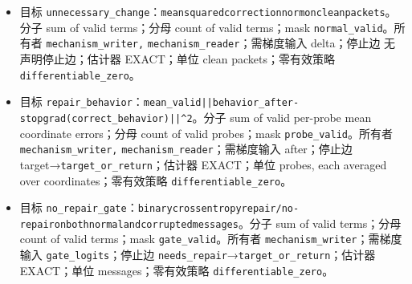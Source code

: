 \documentclass[
  10pt,
]{article}
\begin{document}
\begin{itemize}
\item
  目标
  \nolinkurl{unnecessary_change}：{\small\nolinkurl{mean}\hspace{0.333em}\nolinkurl{squared}\hspace{0.333em}\nolinkurl{correction}\hspace{0.333em}\nolinkurl{norm}\hspace{0.333em}\nolinkurl{on}\hspace{0.333em}\nolinkurl{clean}\hspace{0.333em}\nolinkurl{packets}}。分子
  sum of valid terms；分母 count of valid terms；mask
  \nolinkurl{normal_valid}。所有者 \nolinkurl{mechanism_writer,}
  \nolinkurl{mechanism_reader}；需梯度输入 delta；停止边
  无声明停止边；估计器 EXACT；单位 clean packets；零有效策略
  \nolinkurl{differentiable_zero}。
\item
  目标
  \nolinkurl{repair_behavior}：{\small\nolinkurl{mean_valid}\hspace{0.333em}\nolinkurl{||behavior_after-stopgrad(correct_behavior)||^2}}。分子
  sum of valid per-probe mean coordinate errors；分母 count of valid
  probes；mask \nolinkurl{probe_valid}。所有者
  \nolinkurl{mechanism_writer,} \nolinkurl{mechanism_reader}；需梯度输入
  after；停止边 target→\nolinkurl{target_or_return}；估计器 EXACT；单位
  probes, each averaged over coordinates；零有效策略
  \nolinkurl{differentiable_zero}。
\item
  目标
  \nolinkurl{no_repair_gate}：{\small\nolinkurl{binary}\hspace{0.333em}\nolinkurl{cross}\hspace{0.333em}\nolinkurl{entropy}\hspace{0.333em}\nolinkurl{repair/no-repair}\hspace{0.333em}\nolinkurl{on}\hspace{0.333em}\nolinkurl{both}\hspace{0.333em}\nolinkurl{normal}\hspace{0.333em}\nolinkurl{and}\hspace{0.333em}\nolinkurl{corrupted}\hspace{0.333em}\nolinkurl{messages}}。分子
  sum of valid terms；分母 count of valid terms；mask
  \nolinkurl{gate_valid}。所有者
  \nolinkurl{mechanism_writer}；需梯度输入
  \nolinkurl{gate_logits}；停止边
  \nolinkurl{needs_repair}→\nolinkurl{target_or_return}；估计器
  EXACT；单位 messages；零有效策略 \nolinkurl{differentiable_zero}。
\end{itemize}
\end{document}
